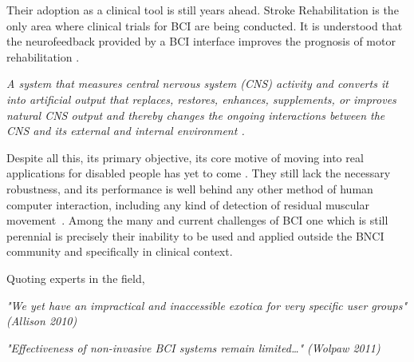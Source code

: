 Their adoption as a clinical tool is still years ahead.  Stroke Rehabilitation is the only area where clinical trials for BCI are being conducted. It is understood that the neurofeedback provided by a BCI interface improves the prognosis of motor rehabilitation \cite{Ang2011}.

\vspace{10px}

\begin{story}
\theoremstyle{definition}
\begin{definition}{}
\label{def:BCI}
\textit{A system that measures central nervous system (CNS) activity and converts it into artificial output that replaces, restores, enhances, supplements, or improves natural CNS output and thereby changes the ongoing interactions between the CNS and its external and internal environment \cite{WolpawJonathanR2012}.}
\end{definition}
\end{story}

Despite all this, its primary objective, its core motive of moving into real applications for disabled people has yet to come \cite{Brunner2014,Jeunet2014,Toward2013}. They still lack the necessary robustness, and its performance is well behind any other method of human computer interaction, including any kind of detection of residual muscular movement~\cite{Clerc}. Among the many and current challenges of BCI \cite{Brunner2014} one which is still perennial is precisely their inability to be used and applied outside the BNCI community and specifically in clinical context.  

Quoting experts in the field,

\vspace{10px}

\textit{"We yet have an impractical and inaccessible exotica for very specific user groups" (Allison 2010)\cite{Allison2010}}

\vspace{10px}

\textit{"Effectiveness of non-invasive BCI systems remain limited…" (Wolpaw 2011) \cite{Wolpaw and Wolpaw2011}}

\vspace{10px}


